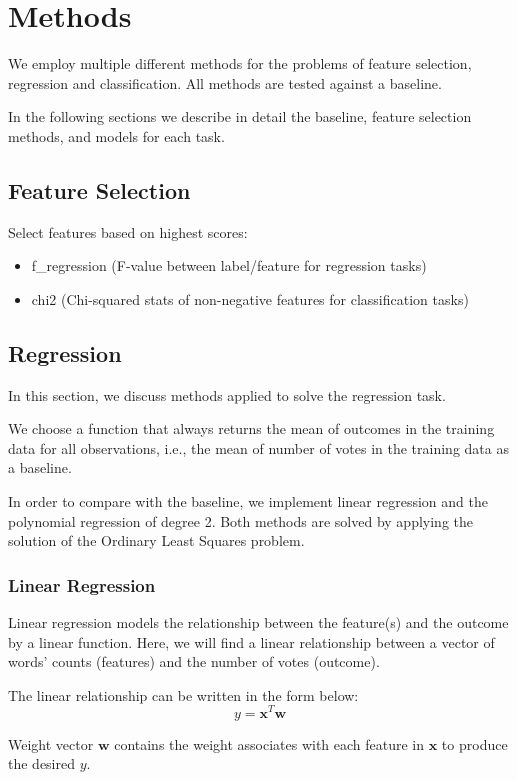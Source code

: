 \section{Methods}
\label{sec:two}

We employ multiple different methods for the problems of feature selection,
regression and classification. All methods are tested against a baseline. 

In the following sections we describe in detail the baseline, feature selection
methods, and models for each task.
\subsection{Feature Selection}

Select features based on highest scores:

\begin{itemize}
\item f\_regression (F-value between label/feature for regression tasks)
\item chi2 (Chi-squared stats of non-negative features for classification tasks)
\end{itemize}

\subsection{Regression}
In this section, we discuss methods applied to solve the regression task.

We choose a function that always returns the mean of outcomes in the training
data for all observations, i.e., the mean of number of votes in the training
data as a baseline.

In order to compare with the baseline, we implement linear regression and the
polynomial regression of degree 2. Both methods are solved by applying the
solution of the Ordinary Least Squares problem.

\subsubsection{Linear Regression}
Linear regression models the relationship between the feature(s) and the outcome
by a linear function. Here, we will find a linear relationship between a vector
of words' counts (features) and the number of votes (outcome).

The linear relationship can be written in the form below:
\[
  y = \mathbf{x}^T\mathbf{w}
\]

Weight vector $\mathbf{w}$ contains the weight associates with each feature in
$\mathbf{x}$ to produce the desired $y$.

